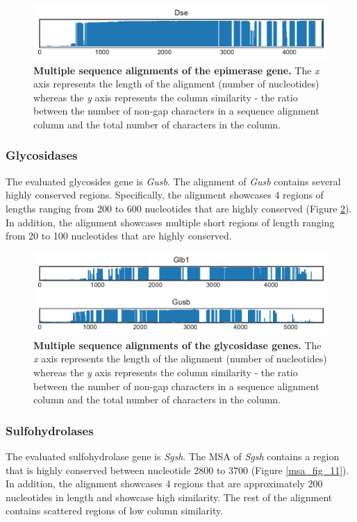 \documentclass{article}
\begin{document}
\begin{figure}
\centering
\includegraphics[width=\textwidth]{./images/epimerase_msa.pdf}
\caption{\textbf{Multiple sequence alignments of the epimerase gene.} The \textit{x} axis represents the length of the alignment (number of nucleotides) whereas the \textit{y} axis represents the column similarity - the ratio between the number of non-gap characters in a sequence alignment column and the total number of characters in the column.}
\label{msa_fig_9}
\end{figure}

\subsubsection{Glycosidases}
The evaluated glycosides gene is \textit{Gusb}. The alignment of \textit{Gusb} contains several highly conserved regions. Specifically, the alignment showcases 4 regions of lengths ranging from 200 to 600 nucleotides that are highly conserved (Figure \ref{msa_fig_10}). In addition, the alignment showcases multiple short regions of length ranging from 20 to 100 nucleotides that are highly conserved.

\begin{figure}
\centering
\includegraphics[width=\textwidth]{./images/glycosidase_msa.pdf}
\caption{\textbf{Multiple sequence alignments of the glycosidase genes.} The \textit{x} axis represents the length of the alignment (number of nucleotides) whereas the \textit{y} axis represents the column similarity - the ratio between the number of non-gap characters in a sequence alignment column and the total number of characters in the column.}
\label{msa_fig_10}
\end{figure}

\subsubsection{Sulfohydrolases}
The evaluated sulfohydrolase gene is \textit{Sgsh}. The MSA of \textit{Sgsh} contains a region that is highly conserved between nucleotide 2800 to 3700 (Figure \ref{msa_fig_11}). In addition, the alignment showcases 4 regions that are approximately 200 nucleotides in length and showcase high similarity. The rest of the alignment contains scattered regions of low column similarity.
\end{document}
